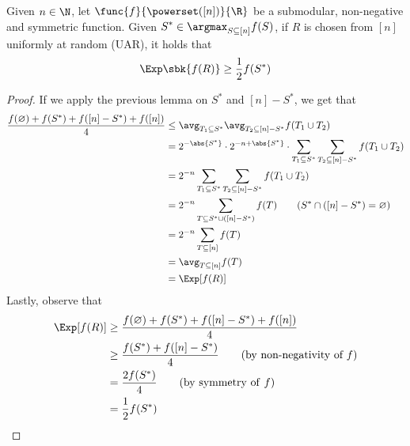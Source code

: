 \documentclass[a4paper, 12pt]{report}
\begin{document}
    \begin{framedthm}{}
        Given $n \in \N$, let $\func{f}{\powerset([n])}{\R}$ be a submodular, non-negative and symmetric function. Given $\displaystyle S^* \in \argmax_{S \subseteq [n]}{f(S)}$, if $R$ is chosen from $[n]$ uniformly at random (UAR), it holds that $$\Exp \sbk{f(R)} \ge \dfrac{1}{2}f(S^*)$$
    \end{framedthm}
    
    \begin{proof}
        If we apply the previous lemma on $S^*$ and $[n] - S^*$, we get that
        \begin{equation*}
            \begin{split}
                \dfrac{f(\varnothing) + f(S^*) + f([n] - S^*) + f([n])}{4} &\le \avg_{T_1 \subseteq S^*}{\avg_{T_2 \subseteq [n] - S^*}{f(T_1 \cup T_2)}} \\
                                                                           &= 2^{- \abs{S^*}} \cdot 2^{- n + \abs{S^*}} \cdot \sum_{T_1 \subseteq S^*}{\sum_{T_2 \subseteq [n] - S^*}{f(T_1 \cup T_2)}} \\
                                                                           &= 2^{-n} \sum_{T_1 \subseteq S^*}{\sum_{T_2 \subseteq [n] - S^*}{f(T_1 \cup T_2)}} \\
                                                                           &= 2^ {-n} \sum_{T \subseteq S^* \cup ([n] - S^*)}{f(T)} \quad \quad (S^* \cap ([n] - S^*) = \varnothing) \\
                                                                           &= 2^{-n} \sum_{T \subseteq [n]}{f(T)} \\
                                                                           &= \avg_{T \subseteq [n]}{f(T)} \\
                                                                           &= \Exp [f(R)]
            \end{split}
        \end{equation*}
        Lastly, observe that
        \begin{equation*}
            \begin{split}
                \Exp[f(R)] &\ge \dfrac{f(\varnothing) + f(S^*) + f([n] - S^*) + f([n])}{4} \\
                           &\ge \dfrac{f(S^*) + f([n] - S^*)}{4} \quad \quad (\mbox{by non-negativity of} \ f) \\
                           &= \dfrac{2 f(S^*)}{4} \quad \quad (\mathrm{by \ symmetry \ of} \ f) \\
                           &= \dfrac{1}{2}f(S^*)
            \end{split}
        \end{equation*}
    \end{proof}
\end{document}
